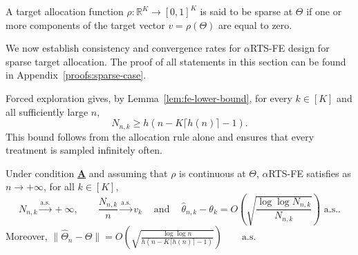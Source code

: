 \begin{definition}
	A target allocation function \(\rho: \mathbb{R}^K \to [0,1]^K\) is said to be sparse at \(\Theta\) if one or more components of the target vector \(v = \rho(\Theta)\) are equal to zero.
\end{definition}

We now establish consistency and convergence rates for \(\alpha\)RTS-FE design for sparse target allocation. The proof of all statements in this section can be found in Appendix~\ref{proofs:sparse-case}.


{\color{revisiongreen}
Forced exploration gives, by Lemma~\ref{lem:fe-lower-bound}, for every \(k\in[K]\) and all sufficiently large \(n\),
\[
N_{n,k}\geq h\!\left(n-K\lceil h(n)\rceil-1\right).
\]
This bound follows from the allocation rule alone and ensures that every treatment is sampled infinitely often.
}

\begin{theorem}\label{thm:sparse-rate}
	Under condition \hyperlink{CA}{\textbf{A}} {\color{revisiongreen} and assuming that \(\rho\) is continuous at \(\Theta\)}, \(\alpha\)RTS-FE satisfies as \(n \to +\infty\), for all $k \in [K]$,
	\[
	N_{n,k}\xrightarrow{\text{a.s.}}+\infty,\qquad
	\frac{N_{n,k}}{n}\xrightarrow{\text{a.s.}}v_k \ \ \ \
	\text{ and } \ \ \ \ \hat\theta_{n,k}-\theta_k=O\!\left(\sqrt{\frac{\log\log N_{n,k}}{N_{n,k}}}\right)\text{ a.s.}.
	\]
{\color{revisiongreen}
Moreover,
\(
\|\hat\Theta_n-\Theta\|
=O\!\left(\sqrt{\frac{\log\log n}
{h\!\left(n-K\lceil h(n)\rceil-1\right)}}\right)
\qquad\text{a.s.}
\)
}
\end{theorem}

